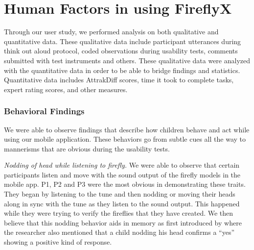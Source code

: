 \chapter{Human Factors in using FireflyX}
\label{sec: humanFactors}

Through our user study, we performed analysis on both qualitative and quantitative data. These qualitative data include participant utterances during think out aloud protocol, coded observations during usability tests, comments submitted with test instruments and others. These qualitative data were analyzed with the quantitative data in order to be able to bridge findings and statistics. Quantitative data includes AttrakDiff scores, time it took to complete tasks, expert rating scores, and other measures. 

\subsection{Behavioral Findings}

We were able to observe findings that describe how children behave and act while using our mobile application. These behaviors go from subtle cues all the way to mannerisms that are obvious during the usability tests.

\textit{Nodding of head while listening to firefly.} We were able to observe that certain participants listen and move with the sound output of the firefly models in the mobile app. P1, P2 and P3 were the most obvious in demonstrating these traits.  They began by listening to the tune and then nodding or moving their heads along in sync with the tune as they listen to the sound output. This happened while they were trying to verify the fireflies that they have created. We then believe that this nodding behavior aids in memory as first introduced by  where the researcher also mentioned that a child nodding his head confirms a “yes” showing a positive kind of response.

